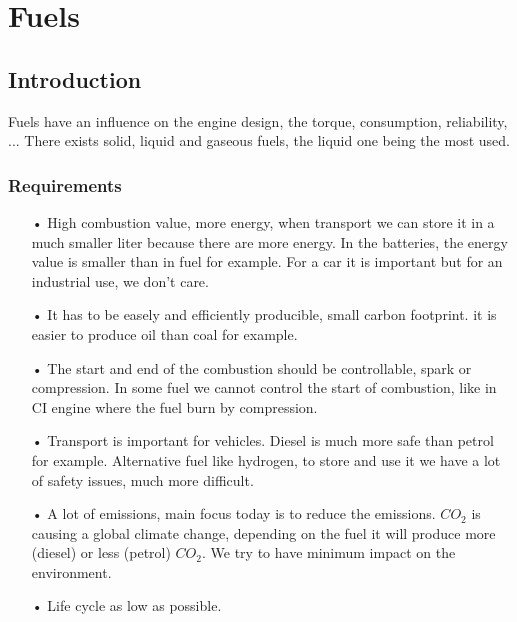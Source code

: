 
\chapter{Fuels}
\section{Introduction}
	Fuels have an influence on the engine design, the torque, consumption, reliability, ... There exists solid, liquid and gaseous fuels, the liquid one being the most used. 
	
\subsection{Requirements}
	\begin{itemize}
	\item[•] High combustion value, more energy, when transport we can store it in a much smaller liter because there are more energy. In the batteries, the energy value is smaller than in fuel for example. For a car it is important but for an industrial use, we don't care. \\
	
	\item[•] It has to be easely and efficiently producible, small carbon footprint. it is easier to produce oil than coal for example.\\
	
	\item[•] The start and end of the combustion should be controllable, spark or compression. In some fuel we cannot control the start of combustion, like in CI engine where the fuel burn by compression.\\
	
	\item[•] Transport is important for vehicles. Diesel is much more safe than petrol for example. Alternative fuel like hydrogen, to store and use it we have a lot of safety issues, much more difficult. \\
	
	\item[•] A lot of emissions, main focus today is to reduce the emissions. $CO_2$ is causing a global climate change, depending on the fuel it will produce more (diesel) or less (petrol) $CO_2$. We try to have minimum impact on the environment.\\
	
	\item[•] Life cycle as low as possible. 
	\end{itemize}
	
